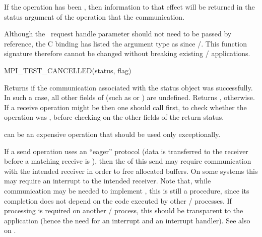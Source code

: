 If the operation has been
, then information to that effect will be returned in the
status argument of the operation that  the communication.

\begin{rationale}
Although the \IN\ request handle parameter should not need to be passed
by reference, the C binding has listed the argument type as \code{*} since
\MPIIDOTO/. This function signature therefore cannot be changed without breaking
existing \MPI/ applications.
\end{rationale}

\begin{funcdef}{MPI\_TEST\_CANCELLED}{(\mbox{status}, \mbox{flag})}
\end{funcdef}

Returns  if the communication associated with the
status object was  successfully.  In such a case, all
other fields of  (such as  or ) are
undefined.  Returns , otherwise.  If a receive
operation might be  then one should call 
first, to check whether the operation was
, before checking on the other fields of the return status.

\begin{users}
 can be an expensive operation that should be used only exceptionally.
\end{users}

\begin{implementors}
If a send operation uses an ``eager'' protocol (data is transferred to
the receiver
before a matching receive is ), then the  of this send
may require communication with the intended receiver in order to free
allocated
buffers.  On some systems this may require an interrupt to the
intended receiver.
Note that, while communication may be needed to implement
,
this is still a  procedure, since its completion does not
depend on the code executed by other \MPI/ processes.  If processing is required on
another \MPI/ process, this should be transparent to the application (hence the need
for an interrupt and an interrupt handler).
See also  on .
\end{implementors}

